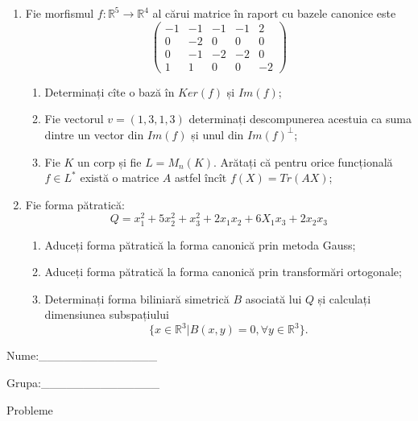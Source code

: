 \documentclass{article}
\begin{document}
\begin{enumerate}
 \item Fie morfismul $f:\mathbb{R}^5 \to \mathbb{R}^4$ al cărui matrice în raport cu bazele canonice este
$$\begin{pmatrix}
-1&-1&-1&-1&2\\
0&-2&0&0&0\\
0&-1&-2&-2&0\\
1&1&0&0&-2
\end{pmatrix}$$

\begin{enumerate}
\item Determinați cîte o bază în $Ker(f)$ și $Im(f)$;
\item Fie vectorul $v=(1,3,1,3)$ determinați descompunerea acestuia ca suma dintre un vector din $Im(f)$ și unul din $Im(f)^\perp$;
\item Fie $K$ un corp și fie $L=M_n(K)$. Arătați că pentru orice funcțională $f \in L^*$ există o matrice $A$ astfel încît $f(X)=Tr(AX)$;
\end{enumerate}
\item Fie forma pătratică:
$$Q= x_1^2+5x_2^2+x_3^2+2x_1x_2+6X_1x_3+2x_2x_3$$

\begin{enumerate}
\item Aduceți forma pătratică la forma canonică prin metoda Gauss;
\item Aduceți forma pătratică la forma canonică prin transformări ortogonale;
\item Determinați forma biliniară simetrică $B$ asociată lui $Q$ și calculați dimensiunea subspațiului
$$\{x \in \mathbb{R}^3 | B(x,y)=0,\forall y \in \mathbb{R}^3\}.$$

\end{enumerate}
\end{enumerate}
\newpage
\begin{flushright}
Nume:\_\_\_\_\_\_\_\_\_\_\_\_\_\_
 
 
Grupa:\_\_\_\_\_\_\_\_\_\_\_\_\_\_
\end{flushright}
\begin{center}
\vspace{2cm}
{\Large Probleme}
\vspace{2cm}
\end{center}
\end{document}
